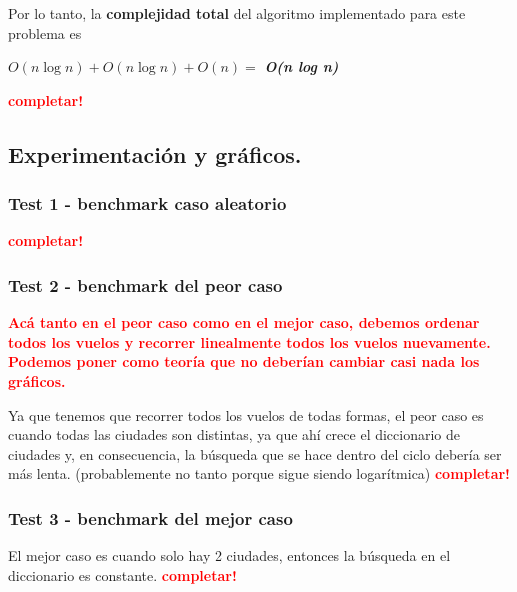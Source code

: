 Por lo tanto, la \textbf{complejidad total} del algoritmo implementado para este problema es

\begin{center}
  $O(n \log n) + O(n \log n) + O(n) =$ \textit{\textbf{O(n log n)}}
\end{center}

\textcolor{red}{\textbf{completar!}}



\newpage
\subsection{Experimentación y gráficos.}

\vspace*{0.3cm}

\subsubsection{Test 1 - benchmark caso aleatorio}

\textcolor{red}{\textbf{completar!}}


\newpage
\subsubsection{Test 2 - benchmark del peor caso}

\textcolor{red}{\textbf{Acá tanto en el peor caso como en el mejor caso, debemos ordenar todos
los vuelos y recorrer linealmente todos los vuelos nuevamente.
Podemos poner como teoría que no deberían cambiar casi nada los gráficos.}}


Ya que tenemos que recorrer todos los vuelos de todas formas, el peor caso
es cuando todas las ciudades son distintas, ya que ahí crece el diccionario
de ciudades y, en consecuencia, la búsqueda que se hace dentro del ciclo
debería ser más lenta. (probablemente no tanto porque sigue siendo
logarítmica)
\textcolor{red}{\textbf{completar!}}


\newpage
\subsubsection{Test 3 - benchmark del mejor caso}

El mejor caso es cuando solo hay 2 ciudades, entonces la búsqueda en el
diccionario es constante.
\textcolor{red}{\textbf{completar!}}
